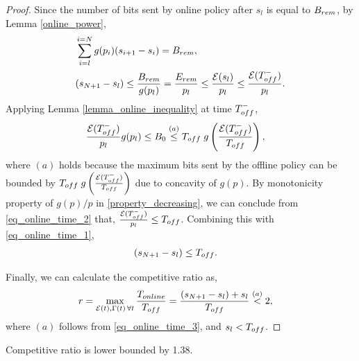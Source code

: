 \begin{proof}
Since the number of bits sent by online policy after ${s}_l$ is equal to $B_{\mbox{\scriptsize{rem}}}$, by Lemma \ref{online_power},
\begin{align}
&\sum_{i=l}^{i={N}}g(p_i)({s}_{i+1}-{s}_i)=B_{\mbox{\scriptsize{rem}}},
\\
&({s}_{{N}+1}-{s}_l)\le\frac{B_{\mbox{\scriptsize{rem}}}}{g(p_l)}=\frac{E_{\mbox{\scriptsize{rem}}}}{p_l}\le \frac{\ETx({s}_l)}{p_l}\le \frac{\ETx(T_{\mbox{\scriptsize{off}}}^-)}{p_l}.
\label{eq_online_time_1}  
\end{align}
Applying Lemma \ref{lemma_online_inequality} at time $T_{\mbox{\scriptsize{off}}}^-$,
\begin{align}
&\frac{\ETx(T_{\mbox{\scriptsize{off}}}^-)}{p_l}g(p_l)\le B_0\stackrel{(a)}{\le}T_{\mbox{\scriptsize{off}}}\; g\left(\frac{\ETx(T_{\mbox{\scriptsize{off}}}^-)}{T_{\mbox{\scriptsize{off}}}}\right),
\label{eq_online_time_2}
\end{align}
where $(a)$ holds because the maximum bits sent by the offline policy can be bounded by $T_{\mbox{\scriptsize{off}}}\; g\left(\frac{\ETx(T_{\mbox{\scriptsize{off}}}^-)}{T_{\mbox{\scriptsize{off}}}}\right)$ due to concavity of $g(p)$. By monotonicity property of $g(p)/p$ in \eqref{property_decreasing}, we can conclude from \eqref{eq_online_time_2} that, $\frac{\ETx(T_{\mbox{\scriptsize{off}}}^-)}{p_l}\le T_{\mbox{\scriptsize{off}}}$. 
Combining this with \eqref{eq_online_time_1},
\begin{align}
&({s}_{{N}+1}-{s}_l)\le T_{\mbox{\scriptsize{off}}}.
\label{eq_online_time_3}
\end{align} 

Finally, we can calculate the competitive ratio as,
\begin{align*}
&r=\displaystyle\max_{\ETx(t),\TRx(t)\hspace{0.5mm} \forall t}\dfrac{T_{\mbox{\scriptsize{online}}}}{T_{\mbox{\scriptsize{off}}}} = \dfrac{({s}_{{N}+1}-{s}_l)+{s}_l}{T_{\mbox{\scriptsize{off}}}} \stackrel{(a)}{<} 2,
\end{align*}
where $(a)$ follows from \eqref{eq_online_time_3}, and ${s}_l<T_{\mbox{\scriptsize{off}}}$.        
\end{proof}
\begin{lemma} Competitive ratio is lower bounded by 1.38.
\end{lemma}